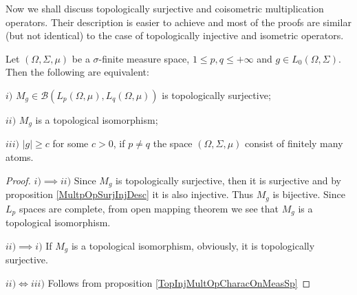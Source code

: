 Now we shall discuss topologically surjective and coisometric multiplication operators. Their description is easier to achieve and most of the proofs are similar (but not identical) to the case of topologically injective and isometric operators.

\begin{proposition}\label{TopSurMultOpCharacOnMeasSp} Let $(\Omega,\Sigma,\mu)$ be a $\sigma$-finite measure space, $1\leq p,q\leq +\infty$ and $g\in L_0(\Omega,\Sigma)$. Then the following are equivalent:

$i)$ $M_g\in\mathcal{B}(L_p(\Omega,\mu),L_q(\Omega,\mu))$ is topologically surjective;

$ii)$ $M_g$ is a topological isomorphism;

$iii)$ $|g|\geq c$ for some $c>0$, if $p\neq q$ the space $(\Omega,\Sigma,\mu)$ consist of finitely many atoms.
\end{proposition}
\begin{proof} $i)$$\implies$$ ii)$ Since $M_g$ is topologically surjective, then it is surjective and by proposition \ref{MultpOpSurjInjDesc} it is also injective. Thus $M_g$ is bijective. Since $L_p$ spaces are complete, from open mapping theorem we see that $M_g$ is a topological isomorphism. 

$ii)$$\implies$$ i)$ If $M_g$ is a topological isomorphism, obviously, it is topologically surjective.

$ii)\Longleftrightarrow iii)$ Follows from proposition \ref{TopInjMultOpCharacOnMeasSp}
\end{proof}
 
